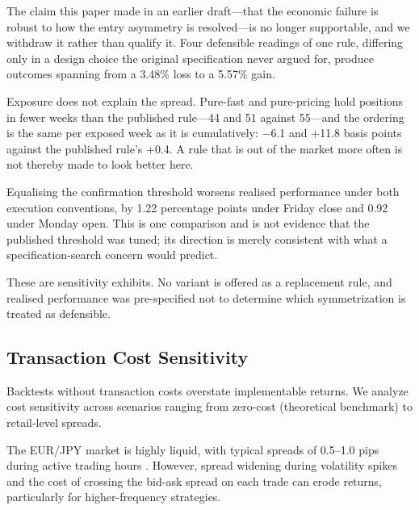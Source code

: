 \documentclass[11pt]{article}
\begin{document}
The claim this paper made in an earlier draft---that the economic failure is robust to how the entry asymmetry is resolved---is no longer supportable, and we withdraw it rather than qualify it. Four defensible readings of one rule, differing only in a design choice the original specification never argued for, produce outcomes spanning from a 3.48\% loss to a 5.57\% gain.

Exposure does not explain the spread. Pure-fast and pure-pricing hold positions in fewer weeks than the published rule---44 and 51 against 55---and the ordering is the same per exposed week as it is cumulatively: $-$6.1 and $+$11.8 basis points against the published rule's $+$0.4. A rule that is out of the market more often is not thereby made to look better here.

Equalising the confirmation threshold worsens realised performance under both execution conventions, by 1.22 percentage points under Friday close and 0.92 under Monday open. This is one comparison and is not evidence that the published threshold was tuned; its direction is merely consistent with what a specification-search concern would predict.

These are sensitivity exhibits. No variant is offered as a replacement rule, and realised performance was pre-specified not to determine which symmetrization is treated as defensible.

\subsection{Transaction Cost Sensitivity}
\label{sec:tcosts}

Backtests without transaction costs overstate implementable returns. We analyze cost sensitivity across scenarios ranging from zero-cost (theoretical benchmark) to retail-level spreads.

The EUR/JPY market is highly liquid, with typical spreads of 0.5--1.0 pips during active trading hours \citep{king2013market}. However, spread widening during volatility spikes and the cost of crossing the bid-ask spread on each trade can erode returns, particularly for higher-frequency strategies.
\end{document}
